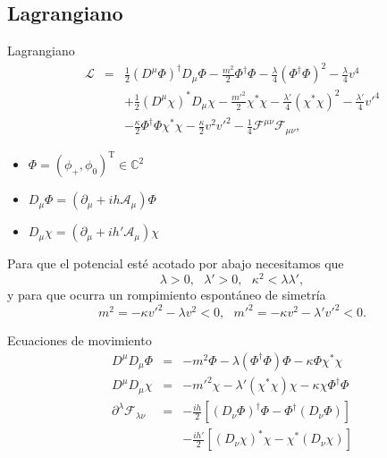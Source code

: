\documentclass[14pt]{beamer}
\begin{document}
\subsection{Lagrangiano}
\begin{frame}{Lagrangiano}
\begin{eqnarray*} 
\mathcal{L} & = & \frac{1}{2}(D^{\mu}\Phi)^{\dagger}D_{\mu}\Phi - \frac{m^2}{2}\Phi^{\dagger}\Phi - \frac{\lambda}{4}(\Phi^{\dagger}\Phi)^2 -\frac{\lambda}{4}v^4   \nonumber\\
 & & +\frac{1}{2}(D^{\mu} \chi)^*D_{\mu} \chi - \frac{m'^2}{2}\chi^*\chi - \frac{\lambda'}{4}(\chi^* \chi)^2 -\frac{\lambda'}{4}v'^4\nonumber \\ 
 & & -\frac{\kappa}{2}\Phi^\dagger\Phi\chi^*\chi  -\frac{\kappa}{2}v^2v'^2 -\frac{1}{4}\mathcal{F}^{\mu\nu}\mathcal{F}_{\mu\nu}, %
\end{eqnarray*}

\begin{itemize}
	\item $\Phi = (\phi_+,\phi_0)^{\text{T}} \in \mathbb{C}^2$
	\item $D_{\mu} \Phi = (\partial_{\mu} + ih\mathcal{A}_{\mu})\Phi$
	\item $D_{\mu} \chi = (\partial_{\mu} + ih'\mathcal{A}_{\mu})\chi$
\end{itemize}
\end{frame}

\begin{frame}
Para que el potencial esté acotado por abajo necesitamos que
\begin{equation*}
	\lambda>0, \ \ \ \lambda'>0, \ \ \ \kappa^2 < \lambda \lambda',
\end{equation*}
y para que ocurra un rompimiento espontáneo de simetría
\begin{equation*}
 m^2 = -\kappa v'^2 - \lambda v^2<0,\ \ \ m'^2 = -\kappa v^2 - \lambda' v'^2<0.
\end{equation*}

\end{frame}

\begin{frame}{Ecuaciones de movimiento}
\begin{eqnarray*}
	D^{\mu}D_{\mu} \Phi & = & -m^2 \Phi - \lambda (\Phi^{\dagger}\Phi)\Phi - \kappa \Phi \chi^* \chi \\
	D^{\mu}D_{\mu} \chi & = & -m'^2 \chi - \lambda' (\chi^{*}\chi)\chi - \kappa \chi \Phi^{\dagger} \Phi \\
	\partial^{\lambda}\mathcal{F}_{\lambda\nu}  & = & -\frac{ih}{2}\left[ (D_{\nu}\Phi)^{\dagger}\Phi-\Phi^{\dagger}(D_{\nu}\Phi)\right] \\
	& & - \frac{ih'}{2}\left[ (D_{\nu}\chi)^{*}\chi-\chi^{*}(D_{\nu}\chi)\right]
\end{eqnarray*}
\end{frame}
\end{document}
